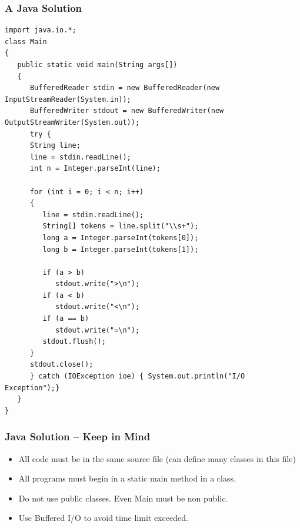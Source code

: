 \documentclass{beamer}
\begin{document}
\begin{frame}[fragile]
  \frametitle{A Java Solution}

  {\tiny
  \begin{block}{}
\begin{verbatim}
import java.io.*;
class Main
{
   public static void main(String args[])
   {
      BufferedReader stdin = new BufferedReader(new InputStreamReader(System.in));
      BufferedWriter stdout = new BufferedWriter(new OutputStreamWriter(System.out));
      try {
      String line;
      line = stdin.readLine();      
      int n = Integer.parseInt(line);
      
      for (int i = 0; i < n; i++)
      {
         line = stdin.readLine();
         String[] tokens = line.split("\\s+");
         long a = Integer.parseInt(tokens[0]);
         long b = Integer.parseInt(tokens[1]);
         
         if (a > b)
            stdout.write(">\n");
         if (a < b)
            stdout.write("<\n");
         if (a == b)
            stdout.write("=\n");
         stdout.flush();
      }
      stdout.close();
      } catch (IOException ioe) { System.out.println("I/O Exception");}
   }
}
\end{verbatim}
  \end{block}
  }
\end{frame}

\begin{frame}
  \frametitle{Java Solution -- Keep in Mind}

  \begin{itemize}
  \item All code must be in the same source file (can define many
    classes in this file)

    \medskip

  \item All programs must begin in a static main method in a
     class.

    \medskip

  \item Do not use public classes. Even Main must be non public.

    \medskip

  \item Use Buffered I/O to avoid time limit exceeded.
  \end{itemize}
\end{frame}
\end{document}
